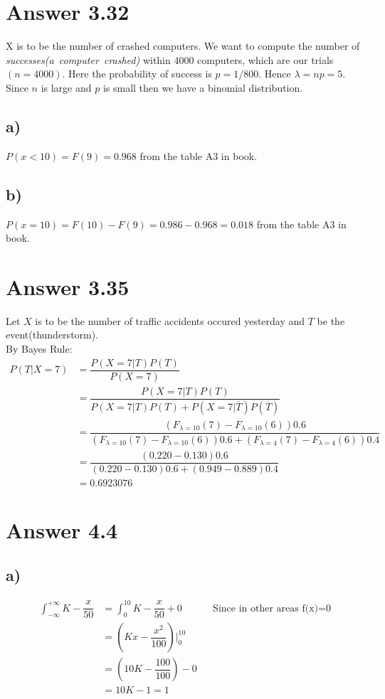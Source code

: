 \documentclass[12pt]{article}
\begin{document}
\section*{Answer 3.32}

X is to be the number of crashed computers. We want to compute the number of \textit{successes(a\ computer\ crashed)} within 4000 computers, which are our trials$(n=4000)$. Here the probability of success is $p=1/800$. Hence $\lambda=np=5$. Since $n$ is large and $p$ is small then we have a binomial distribution.

\subsection*{a)}
$P(x<10)=F(9)=0.968$ from the table A3 in book.

\subsection*{b)}
$P(x=10)=F(10)-F(9)=0.986-0.968=0.018$ from the table A3 in book.

\section*{Answer 3.35}
Let $X$ is to be the number of traffic accidents occured yesterday and $T$ be the event(thunderstorm).\\
By Bayes Rule:
\begin{align*}
P(T | X=7)  & =\dfrac{P(X=7 | T)P(T)}{P(X=7)} \\
            & =\dfrac{P(X=7 | T)P(T)}{P(X=7 | T)P(T)+P(X=7 | \overline{T})P(\overline{T})} \\
			& =\dfrac{ (F_{\lambda=10}(7)-F_{\lambda=10}(6) )0.6}{ (F_{\lambda=10}(7)-F_{\lambda=10}(6) ) 0.6 + (F_{\lambda=4}(7)-F_{\lambda=4}(6) )  0.4} \\
		    & =\dfrac{(0.220-0.130)0.6}{(0.220-0.130)0.6+(0.949-0.889) 0.4} \\
			& = 0.6923076
\end{align*} 

\section*{Answer 4.4}

\subsection*{a)}
\begin{align*}
\int_{-\infty}^{+\infty}K-\dfrac{x}{50} &= \int_{0}^{10}K-\dfrac{x}{50}+0 &&  \text{Since in other areas f(x)=0} \\
& = (Kx-\dfrac{x^2}{100} )\vert_0^{10} \\ & = (10K-\dfrac{100}{100}) - 0 \\ & = 10K - 1 = 1
\end{align*}
\end{document}
